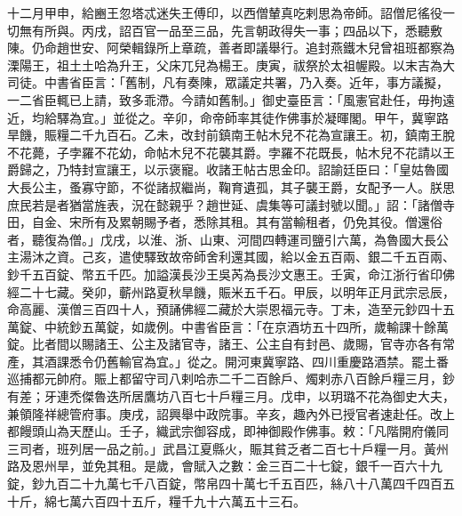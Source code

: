\begin{pinyinscope}
 十二月甲申，給豳王忽塔忒迷失王傅印，以西僧輦真吃剌思為帝師。詔僧尼徭役一切無有所與。丙戌，詔百官一品至三品，先言朝政得失一事；四品以下，悉聽敷陳。仍命趙世安、阿榮輯錄所上章疏，善者即議舉行。追封燕鐵木兒曾祖班都察為溧陽王，祖土土哈為升王，父床兀兒為楊王。庚寅，祓祭於太祖幄殿。以末吉為大司徒。中書省臣言：「舊制，凡有奏陳，眾議定共署，乃入奏。近年，事方議擬，一二省臣輒已上請，致多乖滯。今請如舊制。」御史臺臣言：「風憲官赴任，毋拘遠近，均給驛為宜。」並從之。辛卯，命帝師率其徒作佛事於凝暉閣。甲午，冀寧路旱饑，賑糧二千九百石。乙未，改封前鎮南王帖木兒不花為宣讓王。初，鎮南王脫不花薨，子孛羅不花幼，命帖木兒不花襲其爵。孛羅不花既長，帖木兒不花請以王爵歸之，乃特封宣讓王，以示褒寵。收諸王帖古思金印。詔諭廷臣曰：「皇姑魯國大長公主，蚤寡守節，不從諸叔繼尚，鞠育遺孤，其子襲王爵，女配予一人。朕思庶民若是者猶當旌表，況在懿親乎？趙世延、虞集等可議封號以聞。」詔：「諸僧寺田，自金、宋所有及累朝賜予者，悉除其租。其有當輸租者，仍免其役。僧還俗者，聽復為僧。」戊戌，以淮、浙、山東、河間四轉運司鹽引六萬，為魯國大長公主湯沐之資。己亥，遣使驛致故帝師舍利還其國，給以金五百兩、銀二千五百兩、鈔千五百錠、幣五千匹。加謚漢長沙王吳芮為長沙文惠王。壬寅，命江浙行省印佛經二十七藏。癸卯，蘄州路夏秋旱饑，賑米五千石。甲辰，以明年正月武宗忌辰，命高麗、漢僧三百四十人，預誦佛經二藏於大崇恩福元寺。丁未，造至元鈔四十五萬錠、中統鈔五萬錠，如歲例。中書省臣言：「在京酒坊五十四所，歲輸課十餘萬錠。比者間以賜諸王、公主及諸官寺，諸王、公主自有封邑、歲賜，官寺亦各有常產，其酒課悉令仍舊輸官為宜。」從之。開河東冀寧路、四川重慶路酒禁。罷土番巡捕都元帥府。賑上都留守司八剌哈赤二千二百餘戶、燭剌赤八百餘戶糧三月，鈔有差；牙連禿傑魯迭所居鷹坊八百七十戶糧三月。戊申，以玥璐不花為御史大夫，兼領隆祥總管府事。庚戌，詔興舉中政院事。辛亥，趣內外已授官者速赴任。改上都饅頭山為天歷山。壬子，織武宗御容成，即神御殿作佛事。敕：「凡階開府儀同三司者，班列居一品之前。」武昌江夏縣火，賑其貧乏者二百七十戶糧一月。黃州路及恩州旱，並免其租。是歲，會賦入之數：金三百二十七錠，銀千一百六十九錠，鈔九百二十九萬七千八百錠，幣帛四十萬七千五百匹，絲八十八萬四千四百五十斤，綿七萬六百四十五斤，糧千九十六萬五十三石。



\end{pinyinscope}